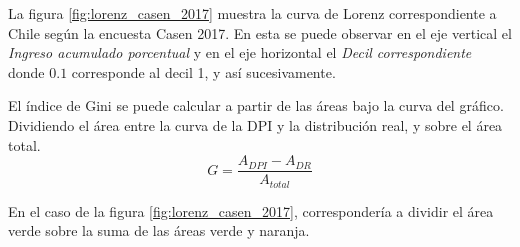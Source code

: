 La figura \ref{fig:lorenz_casen_2017} muestra la curva de Lorenz correspondiente a Chile según la encuesta Casen 2017. En esta se puede observar en el eje vertical el \textit{Ingreso acumulado porcentual} y en el eje horizontal el \textit{Decil correspondiente} donde $0.1$ corresponde al decil 1, y así sucesivamente. \hfill \break


El índice de Gini se puede calcular a partir de las áreas bajo la curva del gráfico. Dividiendo el área entre la curva de la DPI y la distribución real, y sobre el área total. 
\[G = \frac{A_{DPI} - A_{DR}}{A_{total}}\]


En el caso de la figura \ref{fig:lorenz_casen_2017}, correspondería a dividir el área verde sobre la suma de las áreas verde y naranja. 
\newpage